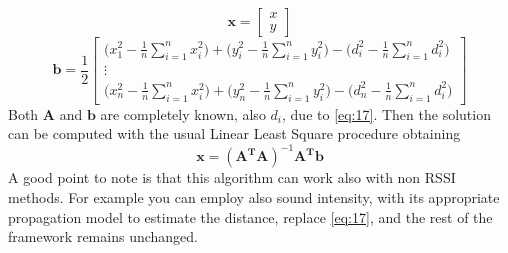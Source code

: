 \documentclass[12pt,twoside]{report}
\begin{document}
$$
\mathbf{x}=\begin{bmatrix}
    x\\
    y
\end{bmatrix}
$$
$$\mathbf{b}=\frac{1}{2}
\begin{bmatrix}
\bigg(x_1^2-\frac{1}{n}\sum_{i=1}^nx^2_i\bigg)+\bigg(y_i^2-\frac{1}{n}\sum_{i=1}^ny^2_i\bigg)-\bigg(d_i^2-\frac{1}{n}\sum_{i=1}^nd_i^2\bigg)\\
\vdots\\
\bigg(x_n^2-\frac{1}{n}\sum_{i=1}^nx^2_i\bigg)+\bigg(y_n^2-\frac{1}{n}\sum_{i=1}^ny^2_i\bigg)-\bigg(d_n^2-\frac{1}{n}\sum_{i=1}^nd_i^2\bigg)
\end{bmatrix}
$$
Both $\mathbf{A}$ and $\mathbf{b}$ are completely known, also $d_i$, due to \ref{eq:17}. Then the solution can be computed with the usual Linear Least Square procedure obtaining
\begin{equation}
    \mathbf{x}=(\mathbf{A^TA})^{-1}\mathbf{A^Tb}
\end{equation}
A good point to note is that this algorithm can work also with non RSSI methods. For example you can employ also sound intensity, with its appropriate propagation model to estimate the distance, replace \ref{eq:17}, and the rest of the framework remains unchanged.
\clearpage
\end{document}
